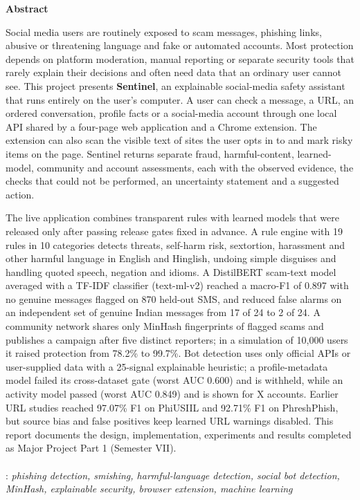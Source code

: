 \newpage
\thispagestyle{plain}
\begin{center}
\textbf {{\Large Abstract}} \\
\vspace{2pc}
\end{center}
\onehalfspacing
\noindent Social media users are routinely exposed to scam messages, phishing links, abusive or threatening language and fake or automated accounts. Most protection depends on platform moderation, manual reporting or separate security tools that rarely explain their decisions and often need data that an ordinary user cannot see. This project presents \textbf{Sentinel}, an explainable social-media safety assistant that runs entirely on the user's computer. A user can check a message, a URL, an ordered conversation, profile facts or a social-media account through one local API shared by a four-page web application and a Chrome extension. The extension can also scan the visible text of sites the user opts in to and mark risky items on the page. Sentinel returns separate fraud, harmful-content, learned-model, community and account assessments, each with the observed evidence, the checks that could not be performed, an uncertainty statement and a suggested action.

\vspace{0.5pc}
\noindent The live application combines transparent rules with learned models that were released only after passing release gates fixed in advance. A rule engine with 19 rules in 10 categories detects threats, self-harm risk, sextortion, harassment and other harmful language in English and Hinglish, undoing simple disguises and handling quoted speech, negation and idioms. A DistilBERT scam-text model averaged with a TF-IDF classifier (text-ml-v2) reached a macro-F1 of 0.897 with no genuine messages flagged on 870 held-out SMS, and reduced false alarms on an independent set of genuine Indian messages from 17 of 24 to 2 of 24. A community network shares only MinHash fingerprints of flagged scams and publishes a campaign after five distinct reporters; in a simulation of 10,000 users it raised protection from 78.2\% to 99.7\%. Bot detection uses only official APIs or user-supplied data with a 25-signal explainable heuristic; a profile-metadata model failed its cross-dataset gate (worst AUC 0.600) and is withheld, while an activity model passed (worst AUC 0.849) and is shown for X accounts. Earlier URL studies reached 97.07\% F1 on PhiUSIIL and 92.71\% F1 on PhreshPhish, but source bias and false positives keep learned URL warnings disabled. This report documents the design, implementation, experiments and results completed as Major Project Part 1 (Semester VII).
\\
\\
: {\it phishing detection, smishing, harmful-language detection, social bot detection, MinHash, explainable security, browser extension, machine learning}
